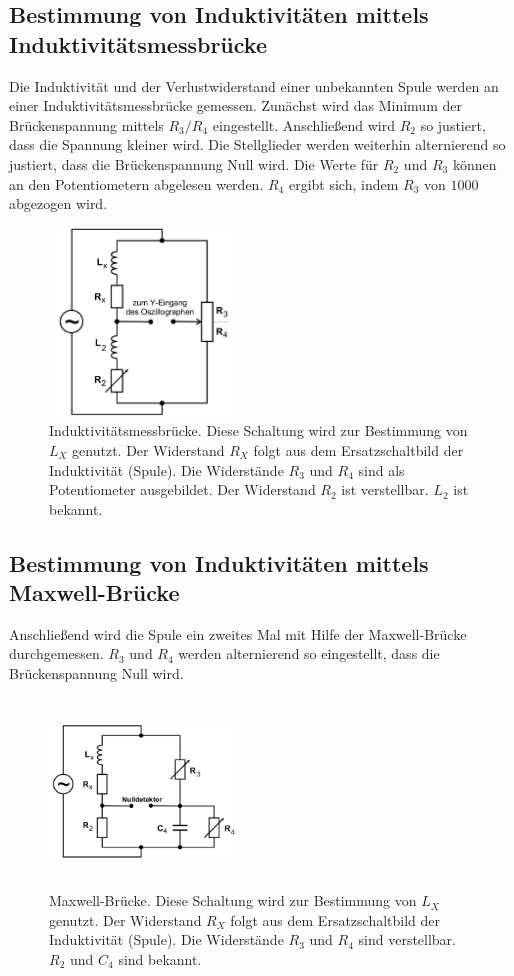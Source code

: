 \subsection{Bestimmung von Induktivitäten mittels Induktivitätsmessbrücke}
Die Induktivität und der Verlustwiderstand einer unbekannten Spule werden 
an einer Induktivitätsmessbrücke gemessen.
\newline
Zunächst wird das Minimum der Brückenspannung mittels $R_3/R_4$ eingestellt.
Anschließend wird $R_2$ so justiert, dass die Spannung kleiner wird.
Die Stellglieder werden weiterhin alternierend so justiert, dass die
Brückenspannung Null wird. Die Werte für $R_2$ und $R_3$ können an den
Potentiometern abgelesen werden. $R_4$ ergibt sich, indem $R_3$ von 
$\num{1000}$ abgezogen wird.
\begin{figure}
    \centering
    \includegraphics[width=5cm, height=5cm]{build/induktivitaet.png}
    \caption{Induktivitätsmessbrücke. Diese Schaltung wird zur Bestimmung
    von $L_X$ genutzt. Der Widerstand $R_X$ folgt aus dem
    Ersatzschaltbild der Induktivität (Spule). Die Widerstände $R_3$ und $R_4$
    sind als Potentiometer ausgebildet. Der Widerstand $R_2$ ist
    verstellbar. $L_2$ ist bekannt.}
    \label{induktivitaet}
\end{figure}

\subsection{Bestimmung von Induktivitäten mittels Maxwell-Brücke}
Anschließend wird die Spule ein zweites Mal mit Hilfe der Maxwell-Brücke durchgemessen.
\newline
$R_3$ und $R_4$ werden alternierend so eingestellt, dass die Brückenspannung
Null wird. 
\begin{figure}
    \centering
    \includegraphics[width=5cm, height=5cm]{build/maxwell.png}
    \caption{Maxwell-Brücke. Diese Schaltung wird zur Bestimmung
    von $L_X$ genutzt. Der Widerstand $R_X$ folgt aus dem
    Ersatzschaltbild der Induktivität (Spule). Die Widerstände
    $R_3$ und $R_4$ sind verstellbar. $R_2$ und $C_4$ sind bekannt.}
    \label{maxwell}
\end{figure}

